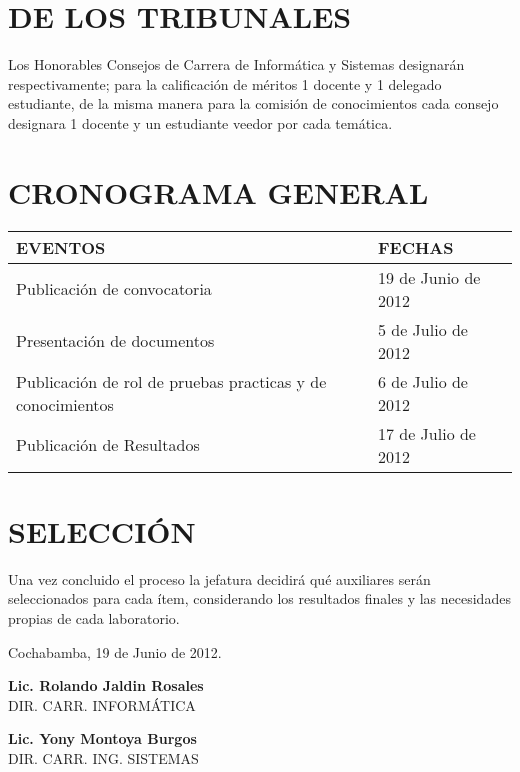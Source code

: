 \documentclass[letterpaper,11pt]{article}
\begin{document}
\section{DE LOS TRIBUNALES}
Los Honorables Consejos de Carrera de Informática y Sistemas designarán respectivamente; para la calificación de méritos 1 docente y 1 delegado estudiante, de la misma manera para la comisión de conocimientos cada consejo designara 1 docente y un estudiante veedor por cada temática.

\section{CRONOGRAMA GENERAL}

\begin{tabular}{|l|l|}
\hline
EVENTOS & FECHAS \\
\hline
Publicación de convocatoria & 19 de Junio de 2012 \\
\hline
Presentación de documentos & 5 de Julio de 2012 \\
\hline
Publicación de rol de pruebas practicas y de conocimientos & 6 de Julio de 2012 \\
\hline
Publicación de Resultados & 17 de Julio de 2012 \\
\hline
\end{tabular}

\section{SELECCIÓN}
Una vez concluido el proceso la jefatura decidirá qué auxiliares serán seleccionados para cada ítem, considerando los resultados finales y las necesidades propias de cada laboratorio.

\begin{center}
Cochabamba, 19 de Junio de 2012.
\end{center}

\vspace{4cm}

\begin{minipage}[b]{0.5\textwidth}
\begin{center}
{\bf Lic. Rolando Jaldin Rosales}\\
DIR. CARR. INFORMÁTICA\\
\end{center}
\end{minipage}
\begin{minipage}[b]{0.5\textwidth}
\begin{center}
{\bf Lic. Yony Montoya Burgos}\\
DIR. CARR. ING. SISTEMAS\\
\end{center}
\end{minipage}
\end{document}
